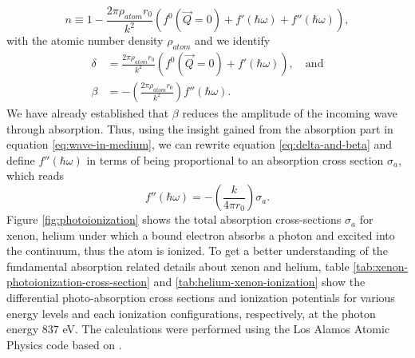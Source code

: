 \begin{equation}
n\equiv 1- \frac{2\pi \rho_{atom}r_{0}}{k^{2}}\left(f^{0}\left(\vec{Q}=0\right)+f'\left(\hbar\omega\right)+f''\left(\hbar\omega\right)\right),
\label{eq:eq:complex-refractive-index-atomic-factors}
\end{equation}
with the atomic number density $\rho_{atom}$ and we identify
\begin{align}
\delta &= \frac{2 \pi \rho_{atom} r_{0}}{k^{2}}\left(f^{0}\left(\vec{Q}=0\right)+f'\left(\hbar\omega\right)\right),\quad \text{and}\\
\beta &= - \left(\frac{2\pi \rho_{atom}r_{0}}{k^{2}}\right)f''\left(\hbar\omega\right).
\label{eq:delta-and-beta}
\end{align}
We have already established that $\beta$ reduces the amplitude of the incoming wave through absorption. Thus, using the insight gained from the absorption part in equation \eqref{eq:wave-in-medium}, we can rewrite equation \eqref{eq:delta-and-beta} and define $f''\left(\hbar\omega\right)$ in terms of being proportional to an absorption cross section $\sigma_{a}$, which reads
\begin{equation}
f''\left(\hbar\omega\right)=-\left(\frac{k}{4\pi r_{0}}\right)\sigma_{a}.
\label{eq:f-2-definition}
\end{equation}
Figure \ref{fig:photoionization} shows the total absorption cross-sections $\sigma_{a}$ for xenon, helium under which a bound electron absorbs a photon and excited into the continuum, thus the atom is ionized. To get a better understanding of the fundamental absorption related details about xenon and helium, table \ref{tab:xenon-photoionization-cross-section} and \ref{tab:helium-xenon-ionization} show the differential photo-absorption cross sections and ionization potentials for various energy levels and each ionization configurations, respectively, at the photon energy $837$ eV. The calculations were performed using the Los Alamos Atomic Physics code based on \citep{Cowan-1981-Cal}.
